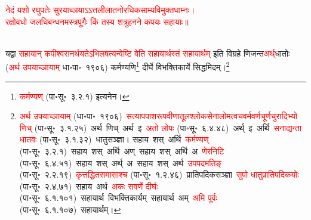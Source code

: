 \centering\textcolor{red}{नेदं यशो रघुपतेः सुरयाच्ञयाऽऽत्तलीलातनोरधिकसाम्यविमुक्तधाम्नः।\nopagebreak\\
रक्षोवधो जलधिबन्धनमस्त्रपूगैः किं तस्य शत्रुहनने कपयः सहायाः॥}\nopagebreak\\
\\
\begin{sloppypar}\justifying\noindent यद्वा \textcolor{red}{सहायान् कपीश्वरानर्थयतेऽभि\-लषत्यन्वेष्टि वेति सहायार्थस्तं सहायार्थम्} इति विग्रहे णिजन्त\-\textcolor{red}{अर्थ्‌}\-धातोः (\textcolor{red}{अर्थ उपयाच्ञायाम्} धा॰पा॰~१९०६) कर्मण्यणि\footnote{\textcolor{red}{कर्मण्यण्} (पा॰सू॰~३.२.१) इत्यनेन।} दीर्घे विभक्ति\-कार्ये सिद्धमिदम्।\footnote{\textcolor{red}{अर्थ उपयाच्ञायाम्} (धा॰पा॰~१९०६)~\arrow \textcolor{red}{सत्याप\-पाश\-रूप\-वीणा\-तूल\-श्लोक\-सेना\-लोम\-त्वच\-वर्म\-वर्ण\-चूर्ण\-चुरादिभ्यो णिच्} (पा॰सू॰~३.१.२५)~\arrow अर्थ~णिच्~\arrow अर्थ~इ~\arrow \textcolor{red}{अतो लोपः} (पा॰सू॰~६.४.४८)~\arrow अर्थ्~इ~\arrow अर्थि~\arrow \textcolor{red}{सनाद्यन्ता धातवः} (पा॰सू॰~३.१.३२)~\arrow धातुसञ्ज्ञा। सहाय~शस्~अर्थि~\arrow \textcolor{red}{कर्मण्यण्} (पा॰सू॰~३.२.१)~\arrow सहाय~शस्~अर्थि~अण्~\arrow सहाय~शस्~अर्थि~अ~\arrow \textcolor{red}{णेरनिटि} (पा॰सू॰~६.४.५१)~\arrow सहाय~शस्~अर्थ्~अ~\arrow सहाय~शस्~अर्थ~\arrow \textcolor{red}{उपपदमतिङ्} (पा॰सू॰~२.२.१९)~\arrow \textcolor{red}{कृत्तद्धित\-समासाश्च} (पा॰सू॰~१.२.४६)~\arrow प्रातिपदिकसञ्ज्ञा~\arrow \textcolor{red}{सुपो धातु\-प्रातिपदिकयोः} (पा॰सू॰~२.४.७१)~\arrow सहाय~अर्थ~\arrow \textcolor{red}{अकः सवर्णे दीर्घः} (पा॰सू॰~६.१.१०१)~\arrow सहायार्थ~\arrow विभक्तिकार्यम्~\arrow सहायार्थ~अम्~\arrow \textcolor{red}{अमि पूर्वः} (पा॰सू॰~६.१.१०७)~\arrow सहायार्थम्।}\end{sloppypar}
\begin{sloppypar}\justifying\noindent\hspace{10mm} \end{sloppypar}
